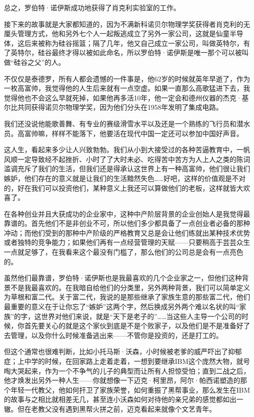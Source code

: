 总之，罗伯特·诺伊斯成功地获得了肖克利实验室的工作。

接下来的故事就是大家都知道的，因为不满新科诺贝尔物理学奖获得者肖克利的无厘头管理方式，他和另外七个人一起叛逃成立了另外一家公司，这就是仙童半导体，这后来被称为硅谷摇篮；隔了几年，他又自己成立一家公司，叫做英特尔，有了英特尔，硅谷最终才得以被如此命名，所以罗伯特·诺伊斯是唯一那个可以被叫做``硅谷之父''的人。

不仅仅是泰德罗，所有人都会遗憾的一件事是，他62岁的时候就英年早逝了，作为一枚高富帅，我觉得他的人生后来就有一点空虚。如果一直那么高歌猛进下去，我觉得他也不会这么早就死掉，如果他再多活10年，他一定会和德州仪器的杰克·基尔比共同获得诺贝尔物理学奖，因为他们分头在1958年发明了集成电路。

我们还没说他能歌善舞、有专业的赛级滑雪水平以及还是一个熟练的飞行员和潜水员。高富帅嘛，样样不能落下，他要活在现代中国一定还可以参加中国好声音。

这人生，看起来多少让人兴致勃勃。我们从小到大接受过的各种苦逼教育中，一帆风顺一定导致经不起挫折、小时了了大时未必、吃得苦中苦方为人上人之类的陈词滥调充斥了我们的生活，但我们还是得承认这世界上有一种高富帅，他们很让我们嫉妒，他们存在的意义就是让我们的生活黯然失色\ldots{}\ldots{}好吧，这样的价值观是不对的，好在我们可以投资他们，某种意义上我还可以算做他们的老板，这样就皆大欢喜了。

在各种创业并且大获成功的企业家中，这种中产阶层背景的企业创始人是我觉得最靠谱的。首先他们不是非创业不可，所以他们多少都具备了一点创业者必备的那种冲动；而他们受到的那种中产阶级的严格教育又总是会让他们练就出某种技术优势或者独特的竞争能力；如果他们再有一点经营管理的天赋------只要稍高于芸芸众生一点就足够了，在我看来这个最没有门槛了，那么他们的公司总是会有一点亮色的。

虽然他们最靠谱，罗伯特·诺伊斯也是我最喜欢的几个企业家之一，但他们这种背景不是我最喜欢的。在我暗自给他们的分类里，另外两种背景，我们可以简单定义为草根和富二代。关于富二代，我说的是那些继承了家族生意的那些富二代，他们最重要的意义在于让你忘了``嫉妒''这两个字，然后换成另外两个难以名状的叫``家族''的字，这世界对他们来说，就是``天下是老子的''\ldots{}\ldots{}当这些人主导一个公司的时候，你首先要关心的就是这个家伙到底是不是个败家子，以及他们是不是准备好了去管理，以及你什么时候准备逃出来------不管你是投资的，还是打工的。

但这个通常也很难判断，比如小托马斯·沃森，小时候被老爹的威严吓出了抑郁症；上中学的时候，在回家路上走着走着，一想到要继承IBM这个庞然大物，就号啕大哭起来，作为一个不争气的儿子的典型而让所有人担惊受怕；直到二战之后，他才焕发出另外一种人生------你就想像一下迈克·柯里昂，阿尔·帕西诺塑造的那个年轻一代教父，他如何扞卫了家族荣誉，如何重振了黑帮事业，那么发生在IBM的故事与之相比就相差无几，甚至连小沃森如何对待他的亲兄弟的感觉都如出一辙。但在老教父没有遇到黑帮火拼之前，迈克看起来就像个文艺青年。

